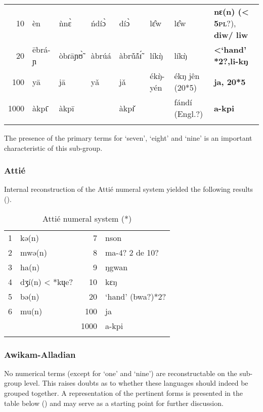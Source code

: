 \begin{table}
\begin{tabularx}{\textwidth}{rlllllQQ}
10 & èn{} & {\`{n}}n{\`{ɛ}} & {\'{n}}dí{\`{ɔ}} & {}dí{\`{ɔ}} & l{\^{ɛ}}w & l{\^{ɛ}}w & \textbf{nɛ(n) (< 5\textsc{pl}}?), \textbf{diw/ liw}\\
20 & ēbrá-ɲ{} & òbɾāɲ{\`{\~ʊ}} & àbrúá{} & àbr{\'ũ}{\'ã}{\'{\~ɪ}} & lík{\`{ŋ}} & lík{\`{ŋ}} & \textbf{<‘}\textbf{hand’ *2?,li-kŋ}\\
100 & yā & jā & y{\v{a}} & j{\v{a}} & ék{\`{ŋ}}-yén & ékŋ j{\^{e}}n (20*5) & \textbf{ja, 20*5}\\
1000 & àkp{\={ɩ}} & àkpī &  & àkp{\v{ɪ}} &  & fándí (Engl.?) & \textbf{a-kpi}\\
\lspbottomrule
\end{tabularx}
\end{table}

The presence of the primary terms for ‘seven’, ‘eight’ and ‘nine’ is an important characteristic of this sub-group. 


 
\subsubsection{Attié}%
Internal reconstruction of the Attié numeral system yielded the following results ().
\newpage
\begin{table}
\caption{\label{tab:3:70}Attié numeral system (*)}


\begin{tabularx}{\textwidth}{lXrl}
\lsptoprule

1 & kə(n) & 7 & nson\\
2 & mwə(n) & 8 & ma-4? 2 de 10?\\
3 & ha(n) & 9 & ŋgwan\\
4 & dʒí(n) < *kɥe? & 10 & kɛŋ\\
5 & bə(n) & 20 & ‘hand' (bwa?)*2?\\
6 & mu(n) & 100 & ja\\
~ &  & 1000 & a-kpi\\
\lspbottomrule
\end{tabularx}
\end{table}


  
\subsubsection{Awikam-Alladian}%
No numerical terms (except for ‘one’ and `nine') are reconstructable on the sub-group level. This raises doubts as to whether these languages should indeed be grouped together. A representation of the pertinent forms is presented in the table below () and may serve as a starting point for further discussion.

